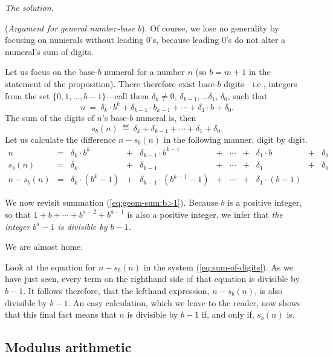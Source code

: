 \noindent \textit{The solution.}

({\it Argument for general number-base $b$}).
%
Of course, we lose no generality by focusing on numerals without
leading $0$'s, because leading $0$'s do not alter a numeral's sum of
digits.

Let us focus on the base-$b$ numeral for a number $n$ (so $b = m+1$ in
the statement of the proposition).  There therefore exist base-$b$
digits---i.e., integers from the set $\{0, 1, \ldots, b-1\}$---call
them $\delta_k \neq 0$, $\delta_{k-1}$, \ldots $\delta_1$, $\delta_0$,
such that
\[ n \ = \ \delta_k \cdot b^k + \delta_{k-1} \cdot b_{k-1} + \cdots +
\delta_1 \cdot b + \delta_0. \]
The sum of the digits of $n$'s base-$b$ numeral is, then
\[ s_b(n) \ \eqdef \ \delta_k + \delta_{k-1} + \cdots + \delta_1 +
\delta_0. \]
Let us calculate the difference $n - s_b(n)$ in the following manner,
digit by digit.
\begin{equation}
\label{eq:sum-of-digits}
\begin{array}{ccccccccccc}
n & = &
\delta_k \cdot b^k & + & \delta_{k-1} \cdot b^{k-1} & + & \cdots
  & + & \delta_1 \cdot b & + & \delta_0 \\
s_b(n) & = &
\delta_k & + & \delta_{k-1} & + & \cdots & + & \delta_1 & + & \delta_0 \\
\hline
n - s_b(n) & = &
\delta_k \cdot (b^k -1) & + &
\delta_{k-1} \cdot (b^{k-1} -1) & + &
\cdots & + &
\delta_1 \cdot (b-1) & & 
\end{array}
\end{equation}

We now revisit summation (\ref{eq:geom-sum:b>1}).  Because $b$ is a
positive integer, so that $1 + b + \cdots + b^{a-2} + b^{a-1}$ is also
a positive integer, we infer that {\em the integer $b^a -1$ is
  divisible by $b-1$.}

We are almost home.  

Look at the equation for $n - s_b(n)$ in the
system (\ref{eq:sum-of-digits}).  As we have just seen, every term on
the righthand side of that equation is divisible by $b-1$.  It follows
therefore, that the lefthand expression, $n - s_b(n)$, is also
divisible by $b-1$.
An easy calculation, which we leave to the reader, now shows that this
final fact means that $n$ is divisible by $b-1$ if, and only if, $s_b(n)$ is.


\subsection{Modulus arithmetic}

